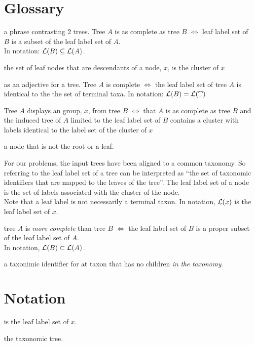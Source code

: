 \newcommand{\defitem}[2]{\item[{\bf #1}]\label{itm:#2} }
\newcommand{\notitem}[1]{\item[]#1}
\section{Glossary}
\begin{compactenum}
\defitem{as complete}{defAsComplete} a phrase contrasting 2 trees.
    Tree $A$ is as complete as tree $B$ $\iff$
    leaf label set of $B$ is a subset of the leaf label set of $A$.\\
    In notation: $\mathcal{L}(B) \subseteq \mathcal{L}(A)$.
\defitem{cluster}{defCluster} the set of leaf nodes that are descendants
    of a node, $x$, is the cluster of $x$
\defitem{complete}{defComplete} as an adjective for a tree. Tree $A$ is complete $\iff$ the leaf label set
    of tree $A$ is identical to the the set of terminal taxa.
    In notation: $\mathcal{L}(B) = \mathcal{L}(\mathbb{T})$
\defitem{display}{defDisplay} Tree $A$ displays an group, $x$, from tree $B$ $\iff$
    that $A$ is as complete as tree $B$ and the induced tree of $A$ limited to the 
    leaf label set of $B$ contains a cluster with labels identical to the label set of the cluster of $x$
\defitem{internal node}{defInternalNode} a node that is not the root or a leaf.
\defitem{leaf labels}{defLeafLabels} For our problems, the input trees have been aligned to a common
    taxonomy. 
    So referring to the leaf label set of a tree can be interpreted as
    ``the set of taxonomic identifiers that are mapped to the leaves of the tree''.
    The leaf label set of a node is the set of labels associated with the cluster of the node.\\
    Note that a leaf label is not necessarily a terminal taxon.
    In notation, $\mathcal{L}(x)$ is the leaf label set of $x$.
\defitem{more complete}{defMoreComplete} tree $A$ is {\em more complete} than tree $B$ $\iff$ the leaf
    label set of $B$ is a proper subset of the leaf label set of $A$. \\
    In notation, $\mathcal{L}(B) \subset \mathcal{L}(A)$.
\defitem{terminal taxon}{defTerminalTaxon} a taxonimic identifier for at taxon that
    has no children {\em in the taxonomy}.
\end{compactenum}
\section{Notation}
\begin{compactenum}
    \notitem{} is the leaf label set of $x$.
    \notitem{\taxonomy} the taxonomic tree.
\end{compactenum}
